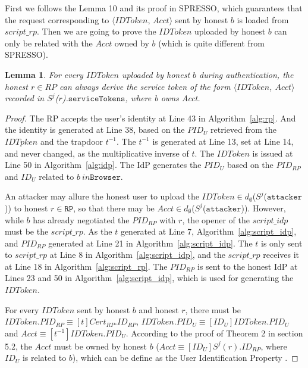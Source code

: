 \documentclass[letterpaper,onecolumn,10pt]{article}
\newtheorem{lemma}{Lemma}
\begin{document}
First we follows the Lemma 10 and its proof in SPRESSO, which guarantees that the request corresponding to $\langle IDToken$, $Acct \rangle$ sent by honest $b$ is loaded from $script\_rp$. 
Then we are going to prove the $IDToken$ uploaded by honest $b$ can only be related with the $Acct$ owned by $b$ (which is quite different from SPRESSO).

\begin{lemma}
For every $IDToken$ uploaded by honest $b$ during authentication, the honest $r \in RP$ can always derive the service token of the form $\langle IDToken$, $Acct \rangle$ recorded in $S^j$($r$).$\mathtt{serviceTokens}$, where b owns Acct. 
\end{lemma}
\begin{proof}
The RP accepts the user's identity at Line 43 in Algorithm~\ref{alg:rp}.
And the identity is generated at Line 38, based on the $PID_U$ retrieved from the $IDTpken$ and the trapdoor $t^{-1}$.
The $t^{-1}$ is generated at Line 13, set at Line 14, and never changed, as the multiplicative inverse of $t$.
The $IDToken$ is issued at Line 50 in Algorithm~\ref{alg:idp}.
The IdP generates the $PID_U$ based on the $PID_{RP}$ and $ID_U$ related to $b \ in \mathtt{Browser}$.

An attacker may allure the honest user to upload the $IDToken \in d_{\emptyset}$($S^j$($\mathtt{attacker}$)) to honest $r \in \mathtt{RP}$, so that there may be $Acct \in d_{\emptyset}$($S^j$($\mathtt{attacker}$)).
However, while $b$ has already negotiated the $PID_{RP}$ with $r$, the opener of the $script\_idp$ must be the $script\_rp$.
    As the $t$ generated at Line 7, Algorithm~\ref{alg:script_idp}, and $PID_{RP}$ generated at Line 21 in Algorithm~\ref{alg:script_idp}.
The $t$ is only sent to $script\_rp$ at Line 8 in Algorithm~\ref{alg:script_idp}, and the $script\_rp$ receives it at Line 18 in Algorithm~\ref{alg:script_rp}.
The $PID_{RP}$ is sent to the honest IdP at Lines 23 and 50 in Algorithm~\ref{alg:script_idp}, which is used for generating the $IDToken$.

For every $IDToken$ sent by honest $b$ and honest $r$, there must be $IDToken.PID_{RP} \equiv [t]Cert_{RP}.ID_{RP}$, $IDToken.PID_U \equiv [ID_U]IDToken.PID_U$ and $Acct \equiv [t^{-1}]IDToken.PID_U$. According to the proof of {\color{blue}Theorem 2} in section 5.2, the $Acct$ must be owned by honest $b$ ($Acct \equiv [ID_U]S^j(r).ID_{RP}$, where $ID_U$ is related to $b$), which can be define as the  {\color{blue} User Identification Property} .
\end{proof}
\end{document}
